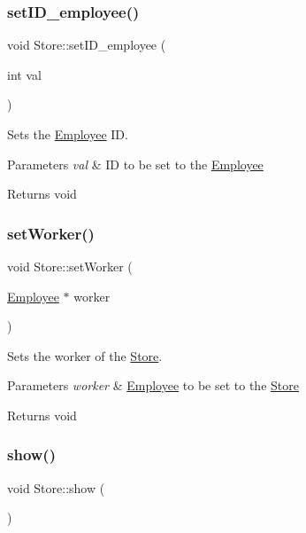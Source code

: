 \subsubsection{\texorpdfstring{set\+I\+D\+\_\+employee()}{setID\_employee()}}
{\footnotesize\ttfamily void Store\+::set\+I\+D\+\_\+employee (\begin{DoxyParamCaption}\item[{int}]{val }\end{DoxyParamCaption})}



Sets the \hyperlink{class_employee}{Employee} ID. 


\begin{DoxyParams}{Parameters}
{\em val} & ID to be set to the \hyperlink{class_employee}{Employee}\\
\hline
\end{DoxyParams}
\begin{DoxyReturn}{Returns}
void 
\end{DoxyReturn}
\mbox{\label{class_store_a5486a87318c219a4cc85438c9b171ffc}} 
\subsubsection{\texorpdfstring{set\+Worker()}{setWorker()}}
{\footnotesize\ttfamily void Store\+::set\+Worker (\begin{DoxyParamCaption}\item[{\hyperlink{class_employee}{Employee} $\ast$}]{worker }\end{DoxyParamCaption})}



Sets the worker of the \hyperlink{class_store}{Store}. 


\begin{DoxyParams}{Parameters}
{\em worker} & \hyperlink{class_employee}{Employee} to be set to the \hyperlink{class_store}{Store}\\
\hline
\end{DoxyParams}
\begin{DoxyReturn}{Returns}
void 
\end{DoxyReturn}
\mbox{\label{class_store_a7c3951daba9c6f0c3c432aea46cfd5b8}} 
\subsubsection{\texorpdfstring{show()}{show()}}
{\footnotesize\ttfamily void Store\+::show (\begin{DoxyParamCaption}{ }\end{DoxyParamCaption})}



